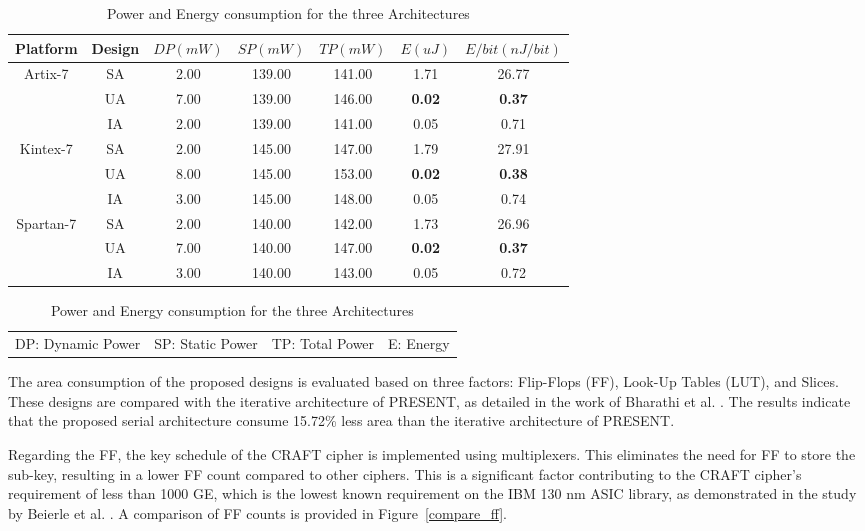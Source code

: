 \documentclass[final,5p,times,twocolumn]{elsarticle}
\begin{document}
\begin{table}
    \begin{threeparttable}
        \caption{Power and Energy consumption for the three Architectures}\label{power_energy_compare}%
        \begin{tabular*}{\textwidth}{@{\extracolsep\fill}|c|c|c|c|c|c|c|}
            \hline
            Platform & Design & $DP(mW)$ & $SP(mW)$ & $TP(mW)$ & $E(uJ)$ & $E/bit(nJ/bit)$ \\
            \hline
            \multirow{3}{*}{Artix-7}  & SA & 2.00 & 139.00 & 141.00 & 1.71 & 26.77 \\
            & UA & 7.00 & 139.00 & 146.00 & \textbf{0.02} & \textbf{0.37} \\
            & IA & 2.00 & 139.00 & 141.00 & 0.05 & 0.71 \\
            \hline
            \multirow{3}{*}{Kintex-7} & SA & 2.00 & 145.00 & 147.00 & 1.79 & 27.91 \\
            & UA & 8.00 & 145.00 & 153.00 & \textbf{0.02} & \textbf{0.38} \\
            & IA & 3.00 & 145.00 & 148.00 & 0.05 & 0.74 \\
            \hline
            \multirow{3}{*}{Spartan-7} & SA & 2.00 & 140.00 & 142.00 & 1.73 & 26.96 \\
            & UA & 7.00 & 140.00 & 147.00 & \textbf{0.02} & \textbf{0.37} \\
            & IA & 3.00 & 140.00 & 143.00 & 0.05 & 0.72 \\
            \hline
        \end{tabular*}
        \begin{tabular}{llll}
            DP: Dynamic Power & SP: Static Power & TP: Total Power & E: Energy
        \end{tabular}
    \end{threeparttable}
\end{table}

The area consumption of the proposed designs is evaluated based on three factors: Flip-Flops (FF), Look-Up Tables (LUT), and Slices. These designs are compared with the iterative architecture of PRESENT, as detailed in the work of Bharathi et al. \cite{Bharathi2022}. The results indicate that the proposed serial architecture consume 15.72\% less area than the iterative architecture of PRESENT.

Regarding the FF, the key schedule of the CRAFT cipher is implemented using multiplexers. This eliminates the need for FF to store the sub-key, resulting in a lower FF count compared to other ciphers. This is a significant factor contributing to the CRAFT cipher's requirement of less than 1000 GE, which is the lowest known requirement on the IBM 130 nm ASIC library, as demonstrated in the study by Beierle et al. \cite{Beierle2019}. A comparison of FF counts is provided in Figure~\ref{compare_ff}.
\end{document}
